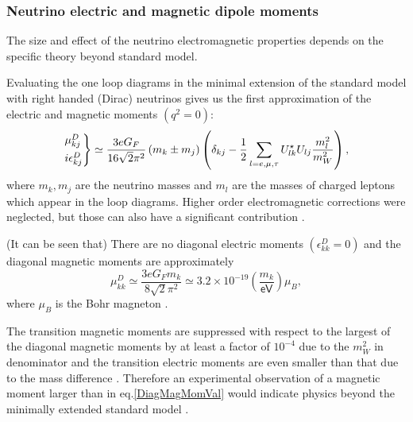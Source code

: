 \subsubsection{Neutrino electric and magnetic dipole moments}

The size and effect of the neutrino electromagnetic properties depends on the specific theory beyond standard model.

Evaluating the one loop diagrams in the minimal extension of the standard model  with right handed (Dirac) neutrinos gives us the first approximation of the electric and magnetic moments $\left(q^2=0\right)$:
\begin{equation}
\begin{rcases}
\mu^D_{kj}\\
i\epsilon^D_{kj}
\end{rcases}
\simeq\frac{3eG_F}{16\sqrt{2}\pi^2}\left(m_k\pm m_j\right)\left(\delta_{kj}-\frac{1}{2}\sum_{l=e,\mu ,\tau}U^{\star}_{lk}U_{lj}\frac{m_l^2}{m_W^2}\right),
\end{equation}
where $m_k,m_j$ are the neutrino masses and $m_l$ are the masses of charged leptons which appear in the loop diagrams. Higher order electromagnetic corrections were neglected, but those can also have a significant contribution \cite{nuElmagInt2015.pdf}.

(It can be seen that) There are no diagonal electric moments $\left(\epsilon_{kk}^D=0\right)$ and the diagonal magnetic moments are approximately
\begin{equation}\label{DiagMagMomVal}
\mu_{kk}^D\simeq\frac{3eG_Fm_k}{8\sqrt{2}\pi^2}\simeq 3.2\times 10^{-19}\left(\frac{m_k}{\textsf{eV}}\right)\mu_B,
\end{equation}
where $\mu_B$ is the Bohr magneton \cite{nuElmagInt2015.pdf}.

The transition magnetic moments are suppressed with respect to the largest of the diagonal magnetic moments by at least a factor of $10^{-4}$ due to the $m_W^2$ in denominator and the transition electric moments are even smaller than that due to the mass difference \cite{nuElmagInt2015.pdf}. Therefore an experimental observation of a magnetic moment larger than in eq.\ref{DiagMagMomVal} would indicate physics beyond the minimally extended standard model \cite{nuMMMajoranaBounds2006.pdf}.

